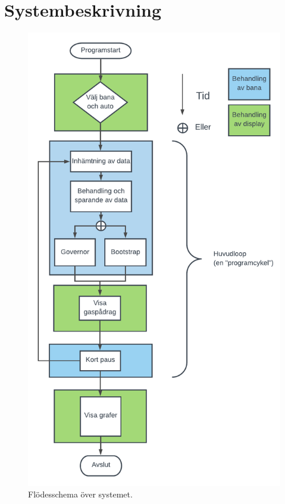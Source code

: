 \section{Systembeskrivning}


\begin{figure}
	\centering
	\includegraphics [height=0.8\textheight] {Figures/flow}
	\caption{Flödesschema över systemet.}
	\label{fig:flow}
\end{figure}

